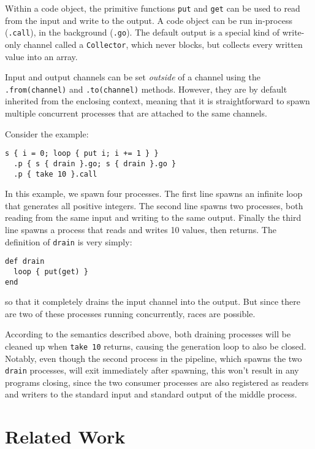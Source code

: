 \documentclass[format=sigconf, review=true, draft=true, screen=true]{acmart}
\begin{document}
Within a code object, the primitive functions \verb/put/ and \verb/get/ can be used to read from the input and write to the output.
A code object can be run in-process (\verb/.call/), in the background (\verb/.go/).
The default output is a special kind of write-only channel called a \verb/Collector/, which never blocks, but collects every written value into an array.

Input and output channels can be set \emph{outside} of a channel using the \verb/.from(channel)/ and \verb/.to(channel)/ methods.
However, they are by default inherited from the enclosing context, meaning that it is straightforward to spawn multiple concurrent processes that are attached to the same channels.

Consider the example:

\begin{verbatim}
s { i = 0; loop { put i; i += 1 } }
  .p { s { drain }.go; s { drain }.go }
  .p { take 10 }.call
\end{verbatim}
In this example, we spawn four processes.
The first line spawns an infinite loop that generates all positive integers.
The second line spawns two processes, both reading from the same input and writing to the same output.
Finally the third line spawns a process that reads and writes 10 values, then returns. The definition of \verb/drain/ is very simply:

\begin{verbatim}
def drain
  loop { put(get) }
end
\end{verbatim}
so that it completely drains the input channel into the output.
But since there are two of these processes running concurrently, races are possible.

According to the semantics described above, both draining processes will be cleaned up when \verb/take 10/ returns, causing the generation loop to also be closed.
Notably, even though the second process in the pipeline, which spawns the two \verb/drain/ processes, will exit immediately after spawning, this won't result in any programs closing, since the two consumer processes are also registered as readers and writers to the standard input and standard output of the middle process.




\section{Related Work}
\end{document}
